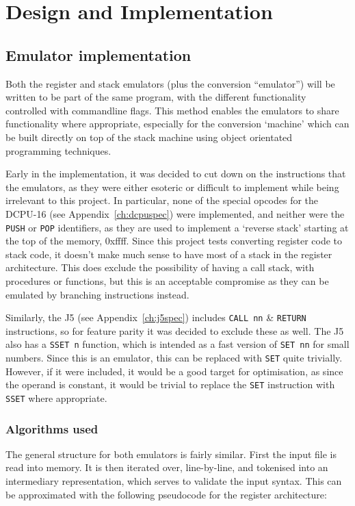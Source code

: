 \chapter{Design and Implementation}\label{ch:designimplementation}

\section{Emulator implementation}
Both the register and stack emulators (plus the conversion ``emulator'') will be
written to be part of the same program, with the different functionality
controlled with commandline flags. This method enables the emulators to share
functionality where appropriate, especially for the conversion `machine' which
can be built directly on top of the stack machine using object orientated
programming techniques.

Early in the implementation, it was decided to cut down on the instructions that
the emulators, as they were either esoteric or difficult to implement while
being irrelevant to this project. In particular, none of the special opcodes for
the DCPU-16 (see Appendix~\ref{ch:dcpuspec}) were implemented, and neither were
the \lstinline{PUSH} or \lstinline{POP} identifiers, as they are used to
implement a `reverse stack' starting at the top of the memory, 0xffff. Since
this project tests converting register code to stack code, it doesn't make much
sense to have most of a stack in the register architecture. This does exclude
the possibility of having a call stack, with procedures or functions, but this
is an acceptable compromise as they can be emulated by branching instructions
instead.

Similarly, the J5 (see Appendix~\ref{ch:j5spec}) includes \lstinline{CALL nn} \&
\lstinline{RETURN} instructions, so for feature parity it was decided to exclude
these as well. The J5 also has a \lstinline{SSET n} function, which is intended
as a fast version of \lstinline{SET nn} for small numbers. Since this is an
emulator, this can be replaced with \lstinline{SET} quite trivially. However, if
it were included, it would be a good target for optimisation, as since the
operand is constant, it would be trivial to replace the \lstinline{SET}
instruction with \lstinline{SSET} where appropriate.

\subsection{Algorithms used}
The general structure for both emulators is fairly similar. First the input
file is read into memory. It is then iterated over, line-by-line, and tokenised
into an intermediary representation, which serves to validate the input syntax.
This can be approximated with the following pseudocode for the register
architecture:

